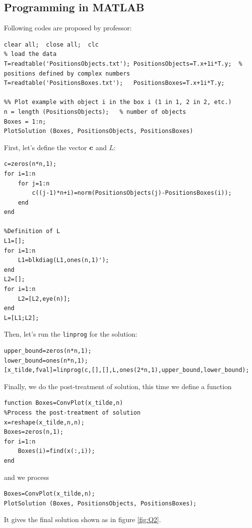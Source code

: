 \documentclass{CSArticle}[english]
\begin{document}
\subsection{Programming in MATLAB}
\label{Q2-code}
Following codes are proposed by professor:
\begin{lstlisting}[style=MATLAB]
%% Initialisation
clear all;  close all;  clc
% load the data
T=readtable('PositionsObjects.txt'); PositionsObjects=T.x+1i*T.y;  % positions defined by complex numbers
T=readtable('PositionsBoxes.txt');   PositionsBoxes=T.x+1i*T.y;

%% Plot example with object i in the box i (1 in 1, 2 in 2, etc.)
n = length (PositionsObjects);   % number of objects 
Boxes = 1:n;
PlotSolution (Boxes, PositionsObjects, PositionsBoxes)
\end{lstlisting}
First, let's define the vector $\boldsymbol{c}$ and $L$:
\begin{lstlisting}[style=MATLAB]
% Definition of c
c=zeros(n*n,1);
for i=1:n
    for j=1:n
        c((j-1)*n+i)=norm(PositionsObjects(j)-PositionsBoxes(i));
    end
end

%Definition of L
L1=[];
for i=1:n
    L1=blkdiag(L1,ones(n,1)');
end
L2=[];
for i=1:n
    L2=[L2,eye(n)];
end
L=[L1;L2];
\end{lstlisting}
Then, let's run the \verb|linprog| for the solution:
\begin{lstlisting}[style=MATLAB]
%Solution
upper_bound=zeros(n*n,1);
lower_bound=ones(n*n,1);
[x_tilde,fval]=linprog(c,[],[],L,ones(2*n,1),upper_bound,lower_bound);
\end{lstlisting}
Finally, we do the post-treatment of solution, this time we define a function
\begin{lstlisting}[style=MATLAB]
function Boxes=ConvPlot(x_tilde,n)
%Process the post-treatment of solution
x=reshape(x_tilde,n,n);
Boxes=zeros(n,1);
for i=1:n
    Boxes(i)=find(x(:,i));
end
\end{lstlisting}
and we process
\begin{lstlisting}[style=MATLAB]
%Plot the result
Boxes=ConvPlot(x_tilde,n);
PlotSolution (Boxes, PositionsObjects, PositionsBoxes);
\end{lstlisting}
It gives the final solution shown as in figure \ref{fig:Q2}.
\end{document}
